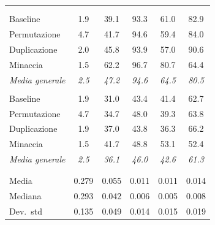 \documentclass[../relazione.tex]{subfiles}
\begin{document}
\begin{xltabular}{\textwidth}{X *{5}{c}}
  \\
  \\
 \hspace{1em}Baseline & 1.9 & 39.1 & 93.3 & 61.0 & 82.9 \\
 \hspace{1em}Permutazione & 4.7 & 41.7 & 94.6 & 59.4 & 84.0 \\
 \hspace{1em}Duplicazione & 2.0 & 45.8 & 93.9 & 57.0 & 90.6 \\
 \hspace{1em}Minaccia & 1.5 & 62.2 & 96.7 & 80.7 & 64.4 \\
 \hspace{1em}\textit{Media generale} & \textit{2.5} & \textit{47.2} & \textit{94.6} & \textit{64.5} & \textit{80.5} \\
  \\
 \hspace{1em}Baseline & 1.9 & 31.0 & 43.4 & 41.4 & 62.7 \\
 \hspace{1em}Permutazione & 4.7 & 34.7 & 48.0 & 39.3 & 63.8 \\
 \hspace{1em}Duplicazione & 1.9 & 37.0 & 43.8 & 36.3 & 66.2 \\
 \hspace{1em}Minaccia & 1.5 & 41.7 & 48.8 & 53.1 & 52.4 \\
 \hspace{1em}\textit{Media generale} & \textit{2.5} & \textit{36.1} & \textit{46.0} & \textit{42.6} & \textit{61.3} \\
  \\
  \\
 \hspace{1em}Media & 0.279 & 0.055 & 0.011 & 0.011 & 0.014 \\
 \hspace{1em}Mediana & 0.293 & 0.042 & 0.006 & 0.005 & 0.008 \\
 \hspace{1em}Dev.\ std & 0.135 & 0.049 & 0.014 & 0.015 & 0.019 \\


\end{xltabular}
\end{document}
